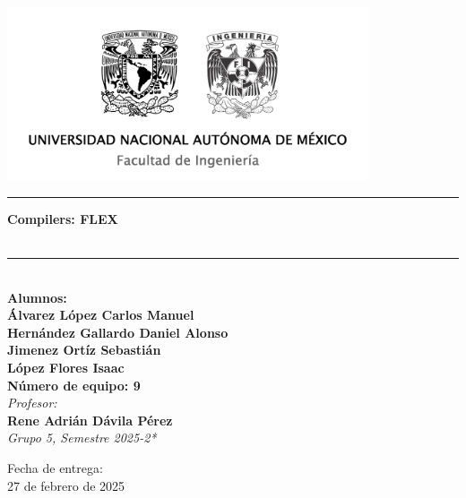 

\begin{titlepage}

\newcommand{\linea}{\rule{\linewidth}{0.7mm}}                 
\center

\includegraphics[width=0.8\textwidth]{logos.png}\\[0.02cm]
\vfill

\linea
\vfill
\textbf{\Large Compilers: FLEX}\\[0.2cm]
\textbf{\Large }\\[0.2cm]
\linea \\
\vfill
\textbf{\large Alumnos:}\\

    \vfill
    \textbf{\large  \textbf{Álvarez López Carlos Manuel }}\\
    \textbf{\large  \textbf{Hernández Gallardo Daniel Alonso }}\\
    \textbf{\large  \textbf{Jimenez Ortíz Sebastián }}\\
    \textbf{\large  \textbf{López Flores Isaac}}\\
    \vfill
\textbf{Número de equipo: 9}\\ 

    \textit{\small Profesor:}\\
    \textbf{Rene Adrián Dávila Pérez}\\
    \textit{\small *Grupo 5, Semestre 2025-2*}
    \vfill

    {\large Fecha de entrega: \\ 27 de febrero de 2025}\\
    \newpage
    \end{titlepage}